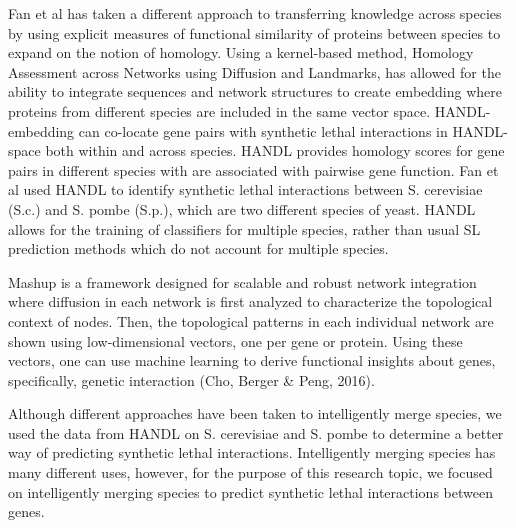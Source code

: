 Fan et al has taken a different approach to transferring knowledge across species by using explicit measures of functional similarity of proteins between species to expand on the notion of homology. Using a kernel-based method, Homology Assessment across Networks using Diffusion and Landmarks, has allowed for the ability to integrate sequences and network structures to create embedding where proteins from different species are included in the same vector space. HANDL-embedding can co-locate gene pairs with synthetic lethal interactions in HANDL-space both within and across species. HANDL provides homology scores for gene pairs in different species with are associated with pairwise gene function. Fan et al used HANDL to identify synthetic lethal interactions between S. cerevisiae (S.c.) and S. pombe (S.p.), which are two different species of yeast. HANDL allows for the training of classifiers for multiple species, rather than usual SL prediction methods which do not account for multiple species. 

Mashup is a framework designed for scalable and robust network integration where diffusion in each network is first analyzed to characterize the topological context of nodes. Then, the topological patterns in each individual network are shown using low-dimensional vectors, one per gene or protein. Using these vectors, one can use machine learning to derive functional insights about genes, specifically, genetic interaction (Cho, Berger \& Peng, 2016). 

Although different approaches have been taken to intelligently merge species, we used the data from HANDL on S. cerevisiae and S. pombe to determine a better way of predicting synthetic lethal interactions. Intelligently merging species has many different uses, however, for the purpose of this research topic, we focused on intelligently merging species to predict synthetic lethal interactions between genes. 

